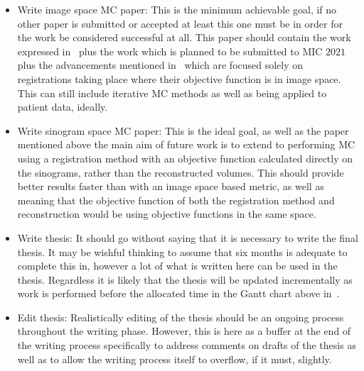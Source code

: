\begin{itemize}
                \item Write image space \gls{MC} paper: This is the minimum achievable goal, if no other paper is submitted or accepted at least this one must be in order for the work be considered successful at all. This paper should contain the work expressed in~ plus the work which is planned to be submitted to \gls{MIC} $2021$ plus the advancements mentioned in~ which are focused solely on registrations taking place where their objective function is in image space. This can still include iterative \gls{MC} methods as well as being applied to patient data, ideally.
                
                \item Write sinogram space \gls{MC} paper: This is the ideal goal, as well as the paper mentioned above the main aim of future work is to extend to performing \gls{MC} using a registration method with an objective function calculated directly on the sinograms, rather than the reconstructed volumes. This should provide better results faster than with an image space based metric, as well as meaning that the objective function of both the registration method and reconstruction would be using objective functions in the same space.
                
                \item Write thesis: It should go without saying that it is necessary to write the final thesis. It may be wishful thinking to assume that six months is adequate to complete this in, however a lot of what is written here can be used in the thesis. Regardless it is likely that the thesis will be updated incrementally as work is performed before the allocated time in the Gantt chart above in~.
    
                \item Edit thesis: Realistically editing of the thesis should be an ongoing process throughout the writing phase. However, this is here as a buffer at the end of the writing process specifically to address comments on drafts of the thesis as well as to allow the writing process itself to overflow, if it must, slightly.
            \end{itemize}
        
